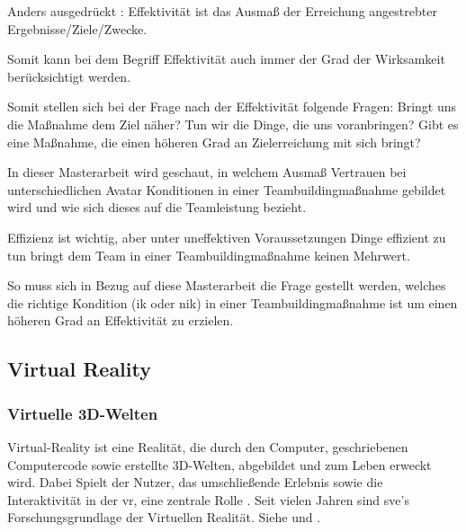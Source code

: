 \documentclass[a4paper,11pt]{article}%
\renewcommand{\\}{\vspace*{0.5\baselineskip} \newline}
\begin{document}
Anders ausgedrückt : Effektivität ist das Ausmaß der Erreichung angestrebter Ergebnisse/Ziele/Zwecke.

Somit kann bei dem Begriff \dq{}Effektivität\dq{} auch immer der Grad der Wirksamkeit berücksichtigt werden.

Somit stellen sich bei der Frage nach der Effektivität folgende Fragen: 
Bringt uns die Maßnahme dem Ziel näher? 
Tun wir die Dinge, die uns voranbringen?
Gibt es eine Maßnahme, die einen höheren Grad an Zielerreichung mit sich bringt?

In dieser Masterarbeit wird geschaut, in welchem Ausmaß Vertrauen bei unterschiedlichen Avatar Konditionen in einer Teambuildingmaßnahme gebildet wird und wie sich dieses auf die Teamleistung bezieht.

Effizienz ist wichtig, aber unter uneffektiven Voraussetzungen Dinge effizient zu tun bringt dem Team in einer Teambuildingmaßnahme keinen Mehrwert.

So muss sich in Bezug auf diese Masterarbeit die Frage gestellt werden, welches die richtige Kondition (\ac{ik} oder \ac{nik}) in einer Teambuildingmaßnahme ist um einen höheren Grad an Effektivität zu erzielen.
	\subsection{Virtual Reality}
	\label{Virtual Reality}
		\subsubsection{Virtuelle 3D-Welten}
Virtual-Reality ist eine Realität, die durch den Computer, geschriebenen Computercode sowie erstellte 3D-Welten, abgebildet und zum Leben erweckt wird. Dabei Spielt der Nutzer, das umschließende Erlebnis sowie die Interaktivität in der \ac{vr}, eine zentrale Rolle \citep[p.6-12]{sherman2018understanding}.
	Seit vielen Jahren sind \ac{sve}'s Forschungsgrundlage der Virtuellen Realität. Siehe \citep{shuffler2011there} \citep{steed1999leadership} und \citep{de2011level}.
	
\end{document}
